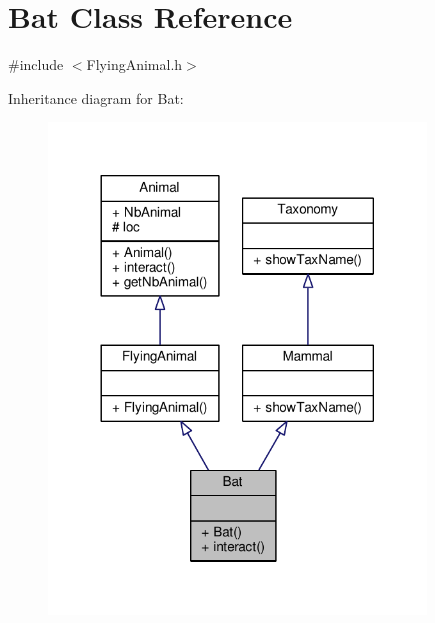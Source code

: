 \hypertarget{classBat}{}\section{Bat Class Reference}
\label{classBat}


{\ttfamily \#include $<$Flying\+Animal.\+h$>$}



Inheritance diagram for Bat\+:
\nopagebreak
\begin{figure}[H]
\begin{center}
\leavevmode
\includegraphics[width=284pt]{classBat__inherit__graph}
\end{center}
\end{figure}


